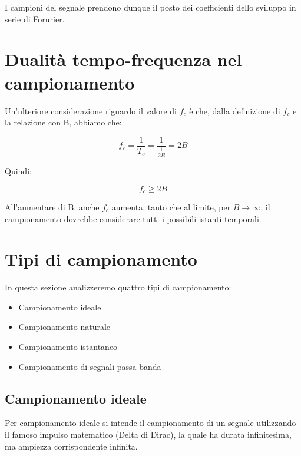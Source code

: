 I campioni del segnale prendono dunque il posto dei coefficienti dello sviluppo in serie di Forurier. \newline 

\newpage 

\section{Dualità tempo-frequenza nel campionamento} 

Un'ulteriore considerazione riguardo il valore di $f_c$ è che, dalla definizione di $f_c$ e la relazione con B, abbiamo che: 

{
    \Large 
    \begin{equation}
        f_c = \frac{1}{T_c} = \frac{1}{\frac{1}{2B}} = 2B 
    \end{equation}
}

Quindi: 

{
    \Large 
    \begin{equation}
        f_c \geq 2B
    \end{equation}
}


All'aumentare di B, anche $f_c$ aumenta, tanto che al limite, per $B \rightarrow \infty$, 
il campionamento dovrebbe considerare tutti i possibili istanti temporali. \newline 

\newpage 

\section{Tipi di campionamento} 

In questa sezione analizzeremo quattro tipi di campionamento: 

\begin{itemize}
    \item Campionamento ideale 
    \item Campionamento naturale 
    \item Campionamento istantaneo 
    \item Campionamento di segnali passa-banda 
\end{itemize}

\newpage 

\subsection{Campionamento ideale}

Per campionamento ideale si intende il campionamento di un segnale utilizzando il 
famoso impulso matematico (Delta di Dirac), la quale ha durata infinitesima, ma ampiezza corrispondente infinita. \newline 

